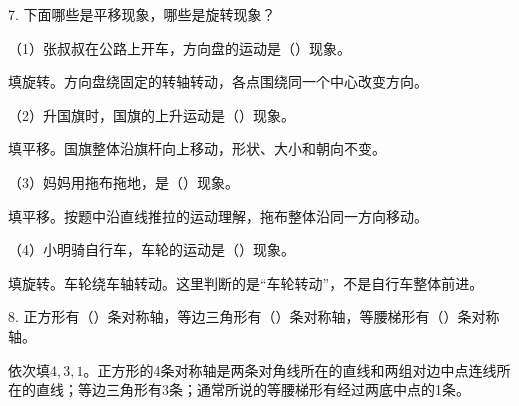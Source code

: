 7. 下面哪些是平移现象，哪些是旋转现象？\par （1）张叔叔在公路上开车，方向盘的运动是（\hspace{1.8em}）现象。\par
\begin{BookAnswer}
填旋转。方向盘绕固定的转轴转动，各点围绕同一个中心改变方向。
\end{BookAnswer}

（2）升国旗时，国旗的上升运动是（\hspace{1.8em}）现象。\par
\begin{BookAnswer}
填平移。国旗整体沿旗杆向上移动，形状、大小和朝向不变。
\end{BookAnswer}

（3）妈妈用拖布拖地，是（\hspace{1.8em}）现象。\par
\begin{BookAnswer}
填平移。按题中沿直线推拉的运动理解，拖布整体沿同一方向移动。
\end{BookAnswer}

（4）小明骑自行车，车轮的运动是（\hspace{1.8em}）现象。\par
\begin{BookAnswer}
填旋转。车轮绕车轴转动。这里判断的是“车轮转动”，不是自行车整体前进。
\end{BookAnswer}

8. 正方形有（\hspace{1.8em}）条对称轴，等边三角形有（\hspace{1.8em}）条对称轴，等腰梯形有（\hspace{1.8em}）条对称轴。\par
\begin{BookAnswer}
依次填\(4,3,1\)。正方形的4条对称轴是两条对角线所在的直线和两组对边中点连线所在的直线；等边三角形有3条；通常所说的等腰梯形有经过两底中点的1条。
\end{BookAnswer}

